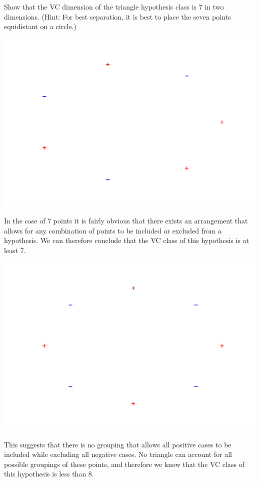 \documentclass{hw}
\begin{document}
    Show that the VC dimension of the triangle hypothesis class is 7 in two dimensions.  (Hint: For best separation, it is best to place the seven points equidistant on a circle.)

\solution
    \includegraphics{better_circle_of_stars7}

    In the case of 7 points it is fairly obvious that there exists an arrangement that allows for any combination of points to be included or excluded from a hypothesis. We can therefore conclude that the VC class of this hypothesis is at least 7.

    \includegraphics{better_circle_of_stars8}

    This suggests that there is no grouping that allows all positive cases to be included while excluding all negative cases. No triangle can account for all possible groupings of these points, and therefore we know that the VC class of this hypothesis is less than 8.
\end{document}

